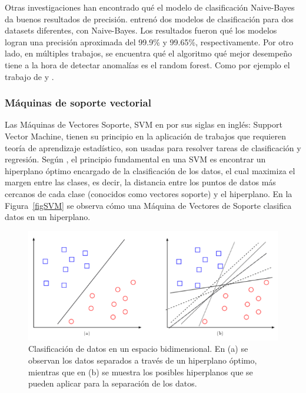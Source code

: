\documentclass[11pt,a4paper,spanish]{book}
\numberwithin{equation}{chapter}
\numberwithin{figure}{chapter}
\begin{document}
Otras investigaciones han encontrado qué el modelo de clasificación Naive-Bayes da buenos resultados de precisión. \cite{chen2016xgboost} entrenó dos modelos de clasificación para dos datasets diferentes, con Naive-Bayes. Los resultados fueron qué los modelos logran una precisión aproximada del 99.9\% y 99.65\%, respectivamente. Por otro lado, en múltiples trabajos, se encuentra qué el algoritmo qué mejor desempeño tiene a la hora de detectar anomalías es el random forest. Como por ejemplo el trabajo de \cite{sharma2022predictive} y \cite{yu2025tkeo}.


\subsubsection{Máquinas de soporte vectorial}

Las Máquinas de Vectores Soporte, SVM en por sus siglas en inglés: Support Vector Machine, tienen su principio en la aplicación de trabajos que requieren teoría de aprendizaje estadístico, son usadas para resolver tareas de clasificación y regresión. Según \cite{amat2017maquinas}, el principio fundamental en una SVM es encontrar un hiperplano óptimo encargado de la clasificación de los datos, el cual maximiza el margen entre las clases, es decir, la distancia entre los puntos de datos más cercanos de cada clase (conocidos como vectores soporte) y el hiperplano. En la Figura~\ref{figSVM} se observa cómo una Máquina de Vectores de Soporte clasifica datos en un hiperplano. 


\begin{figure}[h]
    \centering
    \includegraphics[width=1.0\textwidth]{media/svm-dm.png}
    \caption{Clasificación de datos en un espacio bidimensional. En (a) se observan los datos separados a través de un hiperplano óptimo, mientras que en (b) se muestra los posibles hiperplanos que se pueden aplicar para la separación de los datos.  \protect\cite{suarez2014svm} }
    \label{fig:figSVM}
\end{figure}
\end{document}
